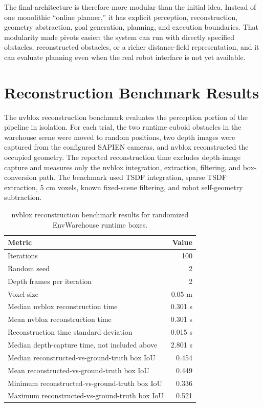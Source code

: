 \documentclass[11pt]{article}
\begin{document}
The final architecture is therefore more modular than the initial idea. Instead of one monolithic ``online planner,'' it has explicit perception, reconstruction, geometry abstraction, goal generation, planning, and execution boundaries. That modularity made pivots easier: the system can run with directly specified obstacles, reconstructed obstacles, or a richer distance-field representation, and it can evaluate planning even when the real robot interface is not yet available.

\section{Reconstruction Benchmark Results}

The nvblox reconstruction benchmark evaluates the perception portion of the pipeline in isolation. For each trial, the two runtime cuboid obstacles in the warehouse scene were moved to random positions, two depth images were captured from the configured SAPIEN cameras, and nvblox reconstructed the occupied geometry. The reported reconstruction time excludes depth-image capture and measures only the nvblox integration, extraction, filtering, and box-conversion path. The benchmark used TSDF integration, sparse TSDF extraction, 5 cm voxels, known fixed-scene filtering, and robot self-geometry subtraction.

\begin{table}[htbp]
    \centering
    \begin{tabular}{l r}
        \hline
        Metric & Value \\
        \hline
        Iterations & 100 \\
        Random seed & 2 \\
        Depth frames per iteration & 2 \\
        Voxel size & 0.05 m \\
        Median nvblox reconstruction time & 0.301 s \\
        Mean nvblox reconstruction time & 0.301 s \\
        Reconstruction time standard deviation & 0.015 s \\
        Median depth-capture time, not included above & 2.801 s \\
        Median reconstructed-vs-ground-truth box IoU & 0.454 \\
        Mean reconstructed-vs-ground-truth box IoU & 0.449 \\
        Minimum reconstructed-vs-ground-truth box IoU & 0.336 \\
        Maximum reconstructed-vs-ground-truth box IoU & 0.521 \\
        \hline
    \end{tabular}
    \caption{nvblox reconstruction benchmark results for randomized EnvWarehouse runtime boxes.}
    \label{tab:nvblox-reconstruction-benchmark}
\end{table}
\end{document}
